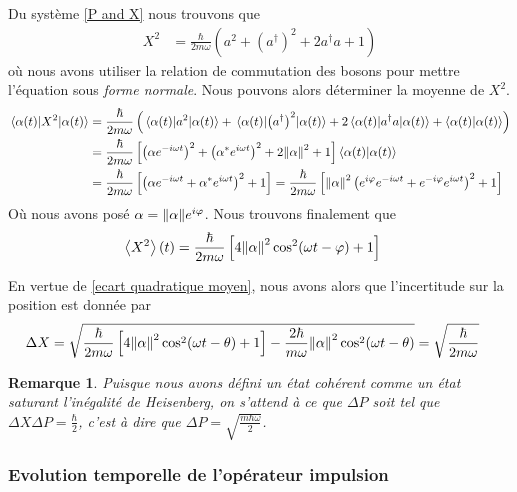 \documentclass[11pt,oneside,a4paper]{article}
\newcommand{\h}{\ensuremath{\hbar}}
\newtheorem{remark}[theorem]{Remarque}
\begin{document}
Du système \eqref{P and X} nous trouvons que 
\begin{align}
  X^2 &= \frac{\h}{2m\omega}\left(a^2+\left(a^\dagger\right)^2+2a^\dagger a+1\right)
\end{align}
où nous avons utiliser la relation de commutation des bosons pour mettre l'équation sous \emph{forme normale}. Nous pouvons alors déterminer la moyenne de $X^2$.
\begin{align}
  \expval{X^2}{\alpha(t)} &= \frac{\h}{2m\omega} \left(\expval{a^2}{\alpha(t)}+\expval{\left(a^\dagger\right)^2}{\alpha(t)}+2\expval{a^\dagger a}{\alpha(t)}+\braket{\alpha(t)}\right)\\
  &= \frac{\h}{2m\omega}\left[\left(\alpha e^{-i\omega t}\right)^2+\left(\alpha^*e^{i\omega t}\right)^2 +2\norm{\alpha}^2+1\right]\braket{\alpha(t)}\\
  &= \frac{\h}{2m\omega}\left[\left(\alpha e^{-i\omega t}+\alpha^*e^{i\omega t}\right)^2+1\right] = \frac{\h}{2m\omega}\left[\norm{\alpha}^2\left(e^{i\varphi}e^{-i\omega t}+e^{-i\varphi}e^{i\omega t}\right)^2+1\right]\label{Mean X^2}
\end{align}
Où nous avons posé $\alpha = \norm{\alpha}e^{i\varphi}$. Nous trouvons finalement que 
\begin{align}
  \expval{X^2}(t) &= \frac{\h}{2m\omega}\left[4\norm{\alpha}^2\cos^2(\omega t-\varphi)+1\right]
\end{align}

En vertue de \eqref{ecart quadratique moyen}, nous avons alors que l'incertitude sur la position est donnée par
\begin{align}
  \Delta X &= \sqrt{\frac{\h}{2m\omega}\left[4\norm{\alpha}^2\cos^2(\omega t-\theta)+1\right] - \frac{2\h}{m\omega}\norm{\alpha}^2\cos^2(\omega t-\theta)} = \sqrt{\frac{\h}{2m\omega}}
\end{align}

\begin{remark}
  Puisque nous avons défini un état cohérent comme un état saturant l'inégalité de Heisenberg, on s'attend à ce que $\Delta P$ soit tel que $\Delta X\Delta P = \frac{\h}{2}$, c'est à dire que $\Delta P = \sqrt{\frac{m\h\omega}{2}}$.
\end{remark}

\subsubsection{Evolution temporelle de l'opérateur impulsion}
\label{Evolution temporelle de l'opérateur impulsion}
\end{document}
